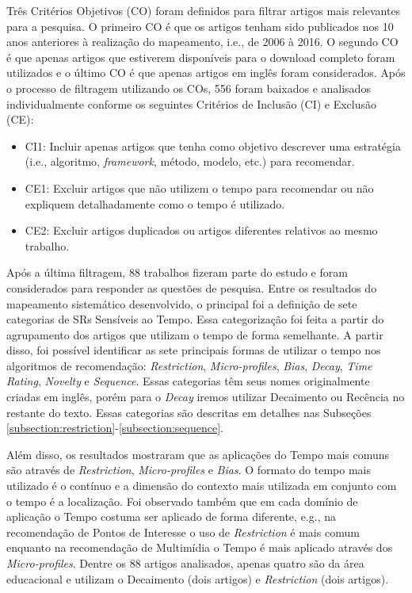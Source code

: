 Três Critérios Objetivos (CO) foram definidos para filtrar artigos mais relevantes para a pesquisa. O primeiro CO é que os
artigos tenham sido publicados nos 10 anos anteriores à realização do mapeamento, i.e., de 2006 à 2016. O segundo CO é
que apenas artigos que estiverem disponíveis para o download completo foram utilizados e o último CO é que apenas artigos
em inglês foram considerados. Após o processo de filtragem utilizando os COs, 556 foram baixados e analisados individualmente
conforme os seguintes Critérios de Inclusão (CI) e Exclusão (CE):

\begin{itemize}
\item CI1: Incluir apenas artigos que tenha como objetivo descrever uma estratégia (i.e., algoritmo, \textit{framework},
método, modelo, etc.) para recomendar.
\item CE1: Excluir artigos que não utilizem o tempo para recomendar ou não expliquem detalhadamente como o tempo é utilizado.
\item CE2: Excluir artigos duplicados ou artigos diferentes relativos ao mesmo trabalho.
\end{itemize}

Após a última filtragem, 88 trabalhos fizeram parte do estudo e foram considerados para responder as
questões de pesquisa. Entre os resultados do mapeamento sistemático desenvolvido, o principal
foi a definição de sete categorias de SRs Sensíveis ao Tempo. Essa categorização foi feita a partir do agrupamento
dos artigos que utilizam o tempo de forma semelhante. A partir disso, foi possível identificar as sete principais
formas de utilizar o tempo nos algoritmos de recomendação: \textit{Restriction}, \textit{Micro-profiles}, \textit{Bias},
\textit{Decay}, \textit{Time Rating}, \textit{Novelty} e \textit{Sequence}. Essas categorias têm seus nomes originalmente
criadas em inglês, porém para o \textit{Decay} iremos utilizar Decaimento ou Recência no restante do texto. Essas
categorias são descritas em detalhes nas Subseções \ref{subsection:restriction}-\ref{subsection:sequence}.

Além disso, os resultados mostraram que as aplicações do Tempo mais comuns são através de \textit{Restriction},
\textit{Micro-profiles} e \textit{Bias}. O formato do tempo mais utilizado é o contínuo e a dimensão do contexto mais
utilizada em conjunto com o tempo é a localização. Foi observado também que em cada domínio de aplicação o Tempo costuma ser
aplicado de forma diferente, e.g., na recomendação de Pontos de Interesse o uso de \textit{Restriction} é mais comum enquanto
na recomendação de Multimídia o Tempo é mais aplicado através dos \textit{Micro-profiles}. Dentre os 88 artigos analisados,
apenas quatro são da área educacional e utilizam o Decaimento (dois artigos) e \textit{Restriction} (dois artigos).

